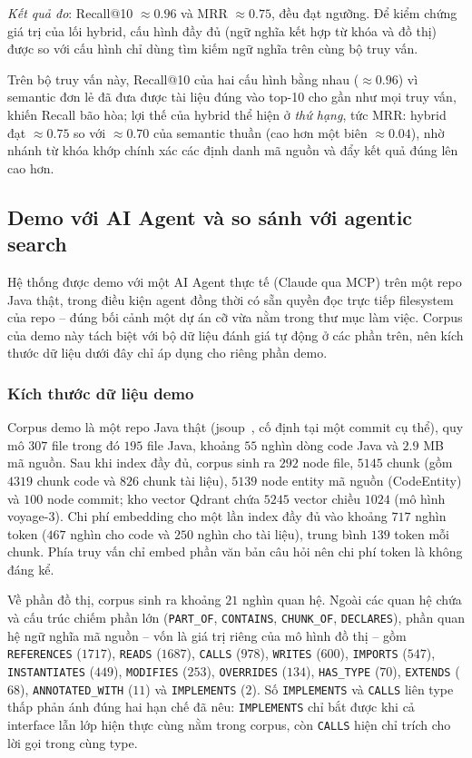 \textit{Kết quả đo}: Recall@10 $\approx 0.96$ và MRR $\approx 0.75$, đều đạt ngưỡng. Để kiểm chứng giá trị của lối hybrid, cấu hình đầy đủ (ngữ nghĩa kết hợp từ khóa và đồ thị) được so với cấu hình chỉ dùng tìm kiếm ngữ nghĩa trên cùng bộ truy vấn. 

Trên bộ truy vấn này, Recall@10 của hai cấu hình bằng nhau ($\approx 0.96$) vì semantic đơn lẻ đã đưa được tài liệu đúng vào top-10 cho gần như mọi truy vấn, khiến Recall bão hòa; lợi thế của hybrid thể hiện ở \textit{thứ hạng}, tức MRR: hybrid đạt $\approx 0.75$ so với $\approx 0.70$ của semantic thuần (cao hơn một biên $\approx 0.04$), nhờ nhánh từ khóa khớp chính xác các định danh mã nguồn và đẩy kết quả đúng lên cao hơn.

\subsection{Demo với AI Agent và so sánh với agentic search}

Hệ thống được demo với một AI Agent thực tế (Claude qua MCP) trên một repo Java thật, trong điều kiện agent đồng thời có sẵn quyền đọc trực tiếp filesystem của repo -- đúng bối cảnh một dự án cỡ vừa nằm trong thư mục làm việc. Corpus của demo này tách biệt với bộ dữ liệu đánh giá tự động ở các phần trên, nên kích thước dữ liệu dưới đây chỉ áp dụng cho riêng phần demo.

\subsubsection{Kích thước dữ liệu demo}

Corpus demo là một repo Java thật (jsoup~\cite{jsoup_repo}, cố định tại một commit cụ thể), quy mô $307$ file trong đó $195$ file Java, khoảng $55$ nghìn dòng code Java và $2.9$ MB mã nguồn. Sau khi index đầy đủ, corpus sinh ra $292$ node file, $5145$ chunk (gồm $4319$ chunk code và $826$ chunk tài liệu), $5139$ node entity mã nguồn (CodeEntity) và $100$ node commit; kho vector Qdrant chứa $5245$ vector chiều $1024$ (mô hình voyage-3). Chi phí embedding cho một lần index đầy đủ vào khoảng $717$ nghìn token ($467$ nghìn cho code và $250$ nghìn cho tài liệu), trung bình $139$ token mỗi chunk. Phía truy vấn chỉ embed phần văn bản câu hỏi nên chi phí token là không đáng kể.

Về phần đồ thị, corpus sinh ra khoảng $21$ nghìn quan hệ. Ngoài các quan hệ chứa và cấu trúc chiếm phần lớn (\texttt{PART\_OF}, \texttt{CONTAINS}, \texttt{CHUNK\_OF}, \texttt{DECLARES}), phần quan hệ ngữ nghĩa mã nguồn -- vốn là giá trị riêng của mô hình đồ thị -- gồm \texttt{REFERENCES} ($1717$), \texttt{READS} ($1687$), \texttt{CALLS} ($978$), \texttt{WRITES} ($600$), \texttt{IMPORTS} ($547$), \texttt{INSTANTIATES} ($449$), \texttt{MODIFIES} ($253$), \texttt{OVERRIDES} ($134$), \texttt{HAS\_TYPE} ($70$), \texttt{EXTENDS} ($68$), \texttt{ANNOTATED\_WITH} ($11$) và \texttt{IMPLEMENTS} ($2$). Số \texttt{IMPLEMENTS} và \texttt{CALLS} liên type thấp phản ánh đúng hai hạn chế đã nêu: \texttt{IMPLEMENTS} chỉ bắt được khi cả interface lẫn lớp hiện thực cùng nằm trong corpus, còn \texttt{CALLS} hiện chỉ trích cho lời gọi trong cùng type.

